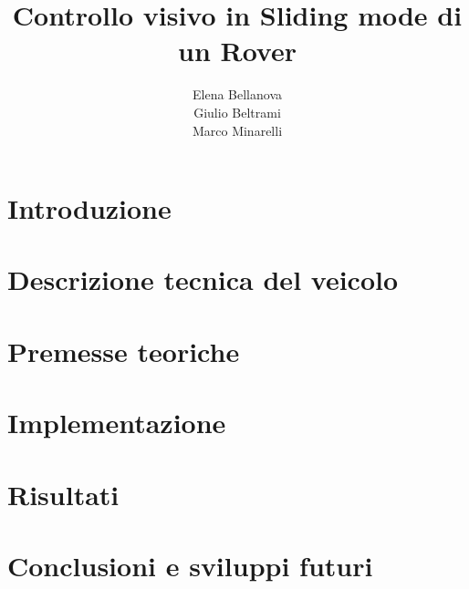 \documentclass{article}
\title{Controllo visivo in Sliding mode di un Rover}
\author{Elena Bellanova \\ Giulio Beltrami \\ Marco Minarelli}
\date{}
\begin{document}


\tableofcontents

\clearpage
\section{Introduzione}


\section{Descrizione tecnica del veicolo} 


\section{Premesse teoriche}


\section{Implementazione}


\section{Risultati}


\section{Conclusioni e sviluppi futuri}


\nocite{*}


\end{document}
